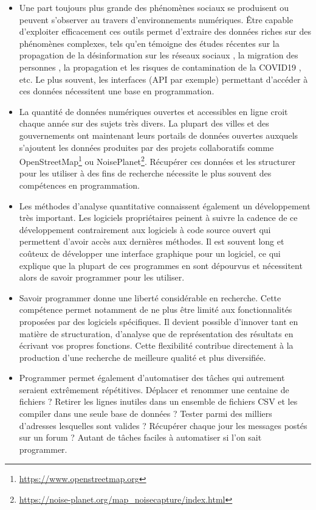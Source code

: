 \documentclass[
  11pt,
  french,
]{book}
\providecommand{\tightlist}{%
  \setlength{\itemsep}{0pt}\setlength{\parskip}{0pt}}
\renewcommand{\href}[2]{#2\footnote{\url{#1}}}
\begin{document}
\begin{itemize}
\tightlist
\item
  Une part toujours plus grande des phénomènes sociaux se produisent ou peuvent s'observer au travers d'environnements numériques. Être capable d'exploiter efficacement ces outils permet d'extraire des données riches sur des phénomènes complexes, tels qu'en témoigne des études récentes sur la propagation de la désinformation sur les réseaux sociaux \citep{allcott2017social}, la migration des personnes \citep{spyratos2019quantifying}, la propagation et les risques de contamination de la COVID19 \citep{boulos2020geographical}, etc. Le plus souvent, les interfaces (API par exemple) permettant d'accéder à ces données nécessitent une base en programmation.
\item
  La quantité de données numériques ouvertes et accessibles en ligne croit chaque année sur des sujets très divers. La plupart des villes et des gouvernements ont maintenant leurs portails de données ouvertes auxquels s'ajoutent les données produites par des projets collaboratifs comme \href{https://www.openstreetmap.org}{OpenStreetMap} ou \href{https://noise-planet.org/map_noisecapture/index.html}{NoisePlanet}. Récupérer ces données et les structurer pour les utiliser à des fins de recherche nécessite le plus souvent des compétences en programmation.
\item
  Les méthodes d'analyse quantitative connaissent également un développement très important. Les logiciels propriétaires peinent à suivre la cadence de ce développement contrairement aux logiciels à code source ouvert qui permettent d'avoir accès aux dernières méthodes. Il est souvent long et coûteux de développer une interface graphique pour un logiciel, ce qui explique que la plupart de ces programmes en sont dépourvus et nécessitent alors de savoir programmer pour les utiliser.
\item
  Savoir programmer donne une liberté considérable en recherche. Cette compétence permet notamment de ne plus être limité aux fonctionnalités proposées par des logiciels spécifiques. Il devient possible d'innover tant en matière de structuration, d'analyse que de représentation des résultats en écrivant vos propres fonctions. Cette flexibilité contribue directement à la production d'une recherche de meilleure qualité et plus diversifiée.
\item
  Programmer permet également d'automatiser des tâches qui autrement seraient extrêmement répétitives. Déplacer et renommer une centaine de fichiers ? Retirer les lignes inutiles dans un ensemble de fichiers CSV et les compiler dans une seule base de données ? Tester parmi des milliers d'adresses lesquelles sont valides ? Récupérer chaque jour les messages postés sur un forum ? Autant de tâches faciles à automatiser si l'on sait programmer.

\end{itemize}
\end{document}
